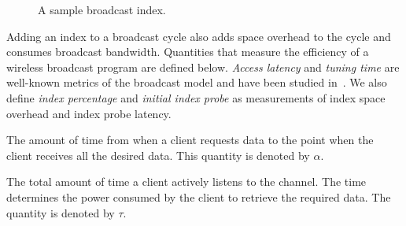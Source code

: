 \begin{figure}[!h]
\centering {} \vspace*{-10pt} \caption{A sample broadcast index.}
\label{fig:index_node}
\end{figure}

Adding an index to a broadcast cycle also adds space overhead to
the cycle and consumes broadcast bandwidth. Quantities that
measure the efficiency of a wireless broadcast program are defined
below. \emph{Access latency} and \emph{tuning time} are well-known
metrics of the broadcast model and have been studied
in~\cite{journals/vldb/ZhengLLLS09,journals/tkde/ImielinskiVB97,
conf/icde/KuZW07,journals/tmc/KuZW08,journals/winet/LeeL99}. We
also define \emph{index percentage} and \emph{initial index probe}
as measurements of index space overhead and index probe latency.

\begin{definition}\label{def:access_latency}
The amount of time from when a client requests data to the point
when the client receives all the desired data. This quantity is
denoted by $\alpha$.
\end{definition}

\begin{definition}\label{def:tuning_time}
The total amount of time a client actively listens to the channel.
The time determines the power consumed by the client to retrieve
the required data. The quantity is denoted by $\tau$.
\end{definition}

